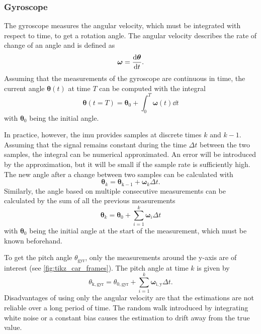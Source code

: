 \subsubsection{Gyroscope}
The gyroscope measures the angular velocity, which must be integrated with respect to time, to get a rotation angle.
The angular velocity describes the rate of change of an angle and is defined as
\begin{equation}
	\boldsymbol{\omega}  =  \dv{\boldsymbol{\theta}}{t}.
\end{equation}
Assuming that the measurements of the gyroscope are continuous in time, the current angle $\boldsymbol{\theta}(t)$ at time $T$ can be computed with the integral
\begin{equation}
	\boldsymbol{\theta}(t = T) = \boldsymbol{\theta}_0 + \int_0^T \boldsymbol{\omega}(t)\dd{t}
\end{equation}
with $\boldsymbol{\theta}_0$ being the initial angle.\par
In practice, however, the \gls{imu} provides samples at discrete times $k$ and $k-1$.
Assuming that the signal remains constant during the time $\Delta t$ between the two samples, the integral can be numerical approximated.
An error will be introduced by the approximation, but it will be small if the sample rate is sufficiently high.
The new angle after a change between two samples can be calculated with
\begin{equation}
	\boldsymbol{\theta}_k = \boldsymbol{\theta}_\mathrm{k - 1} + \boldsymbol{\omega}_k\Delta t.
\end{equation}
Similarly, the angle based on multiple consecutive measurements can be calculated by the sum of all the previous measurements
\begin{equation}
	\boldsymbol{\theta}_k = \boldsymbol{\theta}_0 + \sum_{i = 1}^k \boldsymbol{\omega}_i \Delta t
\end{equation}
with $\boldsymbol{\theta}_0$ being the initial angle at the start of the measurement, which must be known beforehand.\par
To get the pitch angle $\theta_\mathrm{gyr}$, only the measurements around the y-axis are of interest (see \cref{fig:tikz_car_frames}).
The pitch angle at time $k$ is given by
\begin{equation}
	\label{eq:ang_from_gyro}
	\theta_\mathrm{k, gyr} = \theta_{0, \mathrm{gyr} } + \sum_{i = 1}^{k} \boldsymbol{\omega}_\mathrm{i, y} \Delta t.
\end{equation}
Disadvantages of using only the angular velocity are that the estimations are not reliable over a long period of time.
The random walk introduced by integrating white noise or a constant bias causes the estimation to drift away from the true value.


